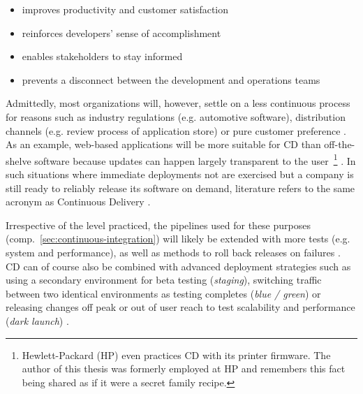 \begin{itemize}
  \item improves productivity and customer satisfaction
  \item reinforces developers' sense of accomplishment
  \item enables stakeholders to stay informed
  \item prevents a disconnect between the development and operations teams
\end{itemize}

Admittedly, most organizations will, however, settle on a less continuous process for reasons such as industry regulations (e.g. automotive software), distribution channels (e.g. review process of application store) or pure customer preference \cite[pp.~68--69]{leppanen2015highways}. As an example, web-based applications will be more suitable for \ac{CD} than off-the-shelve software because updates can happen largely transparent to the user~\footnote{Hewlett-Packard (HP) even practices \ac{CD} with its printer firmware. The author of this thesis was formerly employed at HP and remembers this fact being shared as if it were a secret family recipe.} \cite[p.~22]{savor2016continuous}. In such situations where immediate deployments not are exercised but a company is still ready to reliably release its software on demand, literature refers to the same acronym as Continuous Delivery \cite[p.~50]{chen2015continuous}.

Irrespective of the level practiced, the pipelines used for these purposes (comp.~\autoref{sec:continuous-integration}) will likely be extended with more tests (e.g. system and performance), as well as methods to roll back releases on failures \cite[pp.~52--53]{chen2015continuous}. \ac{CD} can of course also be combined with advanced deployment strategies such as using a secondary environment for beta testing (\textit{staging}), switching traffic between two identical environments as testing completes (\textit{blue / green}) or releasing changes off peak or out of user reach to test scalability and performance (\textit{dark launch}) \cite[p.~23]{savor2016continuous}.
